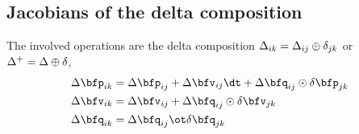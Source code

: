 


\subsection{Jacobians of the delta composition}

The involved operations are the delta composition $\Delta_{ik}=\Delta_{ij}\oplus\delta_{jk}$ or $\Delta^+=\Delta\oplus\delta$,
%
\begin{align*} \label{equ:g_second_composition}
\begin{split}
\Dp_{ik} 
&= \Dp_{ij} + \Dv_{ij}\dt + \Dq_{ij}\od\dpp_{jk} \\
\Dv_{ik} 
&= \Dv_{ij} + \Dq_{ij}\od\dv_{jk} \\
\Dq_{ik} 
&= \Dq_{ij}\ot\dq_{jk} 
\end{split}
\end{align*}

